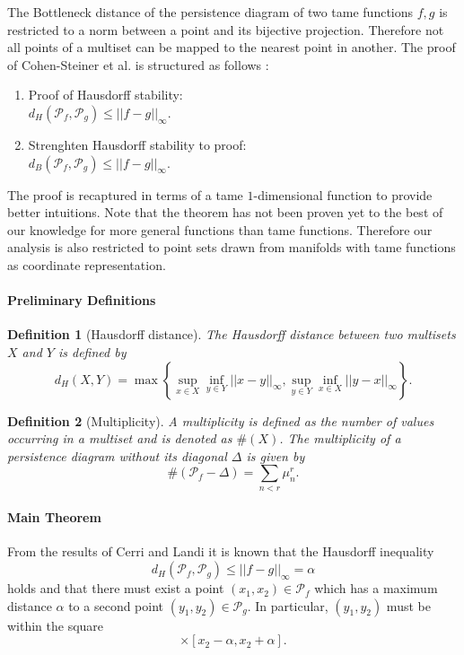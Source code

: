 \documentclass[journal]{IEEEtran}
\newtheorem{definition}{Definition}[section]
\begin{document}
The Bottleneck distance of the persistence diagram of two tame functions $f,g$ is restricted to a norm between a point and its bijective projection. Therefore not all points of a multiset can be mapped to the nearest point in another. The proof of Cohen-Steiner et al. is structured as follows \cite{Cohen-SteinerEH07}:

\begin{enumerate}
  \item Proof of Hausdorff stability: \\
  $d_H(\mathcal{P}_f,\mathcal{P}_g) \leq || f-g ||_\infty$.
  \item Strenghten Hausdorff stability to proof: \\
  $d_B(\mathcal{P}_f,\mathcal{P}_g) \leq || f-g ||_\infty$.
\end{enumerate}

The proof is recaptured in terms of a tame $1$-dimensional function to provide better intuitions. Note that the theorem has not been proven yet to the best of our knowledge for more general functions than tame functions. Therefore our analysis is also restricted to point sets drawn from manifolds with tame functions as coordinate representation.

\paragraph{Preliminary Definitions}
\begin{definition}[Hausdorff distance]
The Hausdorff distance between two multisets $X$ and $Y$ is defined by
\[
    d_H(X,Y) = \max \left\{\sup_{x \in X} \inf_{y \in Y} ||x-y||_\infty, \sup_{y \in Y} \inf_{x \in X} ||y-x||_\infty \right\}.
\]
\end{definition}

\begin{definition}[Multiplicity]
\label{def:multiplicity}
A multiplicity is defined as the number of values occurring in a multiset and is denoted as $\#(X)$. The multiplicity of a persistence diagram without its diagonal $\Delta$ is given by
\begin{equation}
  \#(\mathcal{P}_f - \Delta) = \sum_{n<r} \mu_n^r.
\end{equation}
\end{definition}

\paragraph{Main Theorem}
From the results of Cerri and Landi  \cite{CerriL16} it is known that the Hausdorff inequality
\begin{equation}
  d_H(\mathcal{P}_f,\mathcal{P}_g) \leq ||f-g||_\infty = \alpha
\end{equation}
holds and that there must exist a point $(x_1,x_2) \in \mathcal{P}_f$ which has a maximum distance $\alpha$ to a second point $(y_1,y_2) \in \mathcal{P}_g$. In particular, $(y_1,y_2)$ must be within the square
\begin{equation}
  [x_1 -\alpha, x_1 + \alpha] \times [x_2-\alpha, x_2+\alpha].
\end{equation}
\end{document}
